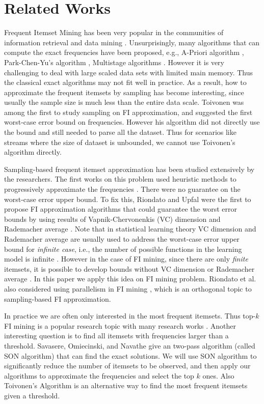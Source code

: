 \documentclass{article}
\begin{document}
\section{Related Works}
\label{sec:rw}
Frequent Itemset Mining has been very popular in the communities of information retrieval and data mining \cite{LRU14}. Unsurprisingly, many algorithms that can compute the exact frequencies have been proposed, e.g., A-Priori algorithm \cite{AIS93}, Park-Chen-Yu's algorithm \cite{PCY95}, Multistage algorithms \cite{FSG99}.
However it is very challenging to deal with large scaled data sets with limited main memory. Thus the classical exact algorithms may not fit well in practice. As a result, how to approximate the frequent itemsets by sampling has become interesting, since usually the sample size is much less than the entire data scale. Toivonen \cite{Toi96} was among the first to study sampling on FI approximation, and suggested the first worst-case error bound on frequencies. However his algorithm did not directly use the bound and still needed to parse all the dataset. Thus for scenarios like streams where the size of dataset is unbounded, we cannot use Toivonen's algorithm directly.

Sampling-based frequent itemset approximation has been studied extensively by the researchers. The first works on this problem used heuristic methods to progressively approximate the frequencies \cite{CHS02,CCY05,Parth02}. There were no guarantee on the worst-case error upper bound. To fix this, Riondato and Upfal were the first to propose FI approximation algorithms that could guarantee the worst error bounds by using results of Vapnik-Chervonenkis (VC) dimension \cite{RU12,RU14} and Rademacher average \cite{RU15}. Note that in statistical learning theory VC dimension and Rademacher average are usually used to address the worst-case error upper bound for \emph{infinite case}, i.e., the number of possible functions in the learning model is infinite \cite{BBL04}. However in the case of FI mining, since there are only \emph{finite} itemsets, it is possible to develop bounds without VC dimension or Rademacher average \cite{BBL04}. In this paper we apply this idea on FI mining problem. Riondato et al. also considered using parallelism in FI mining \cite{RDF12}, which is an orthogonal topic to sampling-based FI approximation.

In practice we are often only interested in the most frequent itemsets. Thus top-$k$ FI mining is a popular research topic with many research works \cite{PRU10,SW02,RU15,RV14}. Another interesting question is to find all itemsets with frequencies larger than a threshold. Savasere, Omiecinski, and Navathe \cite{SON95} give an two-pass algorithm (called SON algorithm) that can find the exact solutions. We will use SON algorithm to significantly reduce the number of itemsets to be observed, and then apply our algorithms to approximate the frequencies and select the top $k$ ones. Also Toivonen’s Algorithm \cite{Toi96} is an alternative way to find the most frequent itemsets given a threshold.
\end{document}
